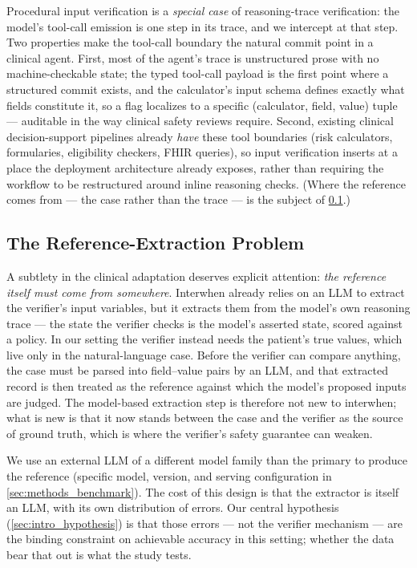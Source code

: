 Procedural input verification is a \emph{special case} of
reasoning-trace verification: the model's tool-call emission is one
step in its trace, and we intercept at that step. Two properties make
the tool-call boundary the natural commit point in a clinical agent.
First, most of the agent's trace is unstructured prose with no
machine-checkable state; the typed tool-call payload is the first point
where a structured commit exists, and the calculator's input schema
defines exactly what fields constitute it, so a flag localizes to a
specific (calculator, field, value) tuple --- auditable in the way
clinical safety reviews require. Second, existing clinical
decision-support pipelines already \emph{have} these tool boundaries
(risk calculators, formularies, eligibility checkers, FHIR queries),
so input verification inserts at a place the deployment architecture
already exposes, rather than requiring the workflow to be restructured
around inline reasoning checks. (Where the reference comes from --- the
case rather than the trace --- is the subject of
\cref{sec:bg_reference}.)

\subsection{The Reference-Extraction Problem}
\label{sec:bg_reference}

A subtlety in the clinical adaptation deserves explicit attention:
\emph{the reference itself must come from somewhere}. Interwhen already
relies on an LLM to extract the verifier's input variables, but it
extracts them from the model's own reasoning trace --- the state the
verifier checks is the model's asserted state, scored against a policy.
In our setting the verifier instead needs the patient's true values,
which live only in the natural-language case. Before the verifier can
compare anything, the case must be parsed into field--value pairs by an
LLM, and that extracted record is then treated as the reference against
which the model's proposed inputs are judged. The model-based
extraction step is therefore not new to interwhen; what is new is that
it now stands between the case and the verifier as the source of ground
truth, which is where the verifier's safety guarantee can weaken.

We use an external LLM of a different model family than the primary
to produce the reference (specific model, version, and serving
configuration in \cref{sec:methods_benchmark}). The cost of this
design is that the extractor is itself an LLM, with its own
distribution of errors. Our central hypothesis
(\cref{sec:intro_hypothesis}) is that those errors --- not the verifier
mechanism --- are the binding constraint on achievable accuracy in this
setting; whether the data bear that out is what the study tests.

